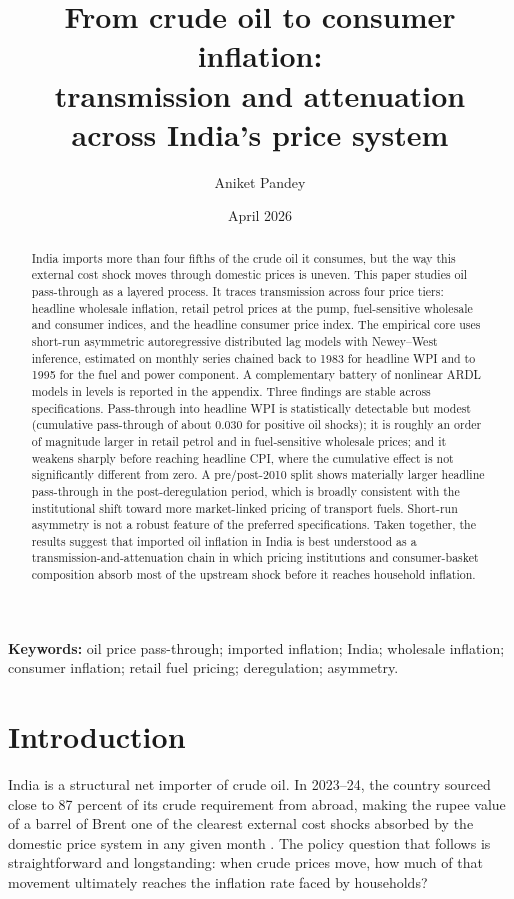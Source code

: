 \documentclass[11pt,a4paper]{article}
\title{\bfseries From crude oil to consumer inflation:\\ transmission and attenuation across India's price system}
\author{Aniket Pandey}
\date{April 2026}
\begin{document}
\maketitle

\begin{abstract}
\noindent India imports more than four fifths of the crude oil it consumes, but the way this external cost shock moves through domestic prices is uneven. This paper studies oil pass-through as a layered process. It traces transmission across four price tiers: headline wholesale inflation, retail petrol prices at the pump, fuel-sensitive wholesale and consumer indices, and the headline consumer price index. The empirical core uses short-run asymmetric autoregressive distributed lag models with Newey--West inference, estimated on monthly series chained back to 1983 for headline WPI and to 1995 for the fuel and power component. A complementary battery of nonlinear ARDL models in levels is reported in the appendix. Three findings are stable across specifications. Pass-through into headline WPI is statistically detectable but modest (cumulative pass-through of about 0.030 for positive oil shocks); it is roughly an order of magnitude larger in retail petrol and in fuel-sensitive wholesale prices; and it weakens sharply before reaching headline CPI, where the cumulative effect is not significantly different from zero. A pre/post-2010 split shows materially larger headline pass-through in the post-deregulation period, which is broadly consistent with the institutional shift toward more market-linked pricing of transport fuels. Short-run asymmetry is not a robust feature of the preferred specifications. Taken together, the results suggest that imported oil inflation in India is best understood as a transmission-and-attenuation chain in which pricing institutions and consumer-basket composition absorb most of the upstream shock before it reaches household inflation.
\end{abstract}

\noindent\textbf{Keywords:} oil price pass-through; imported inflation; India; wholesale inflation; consumer inflation; retail fuel pricing; deregulation; asymmetry.

\bigskip

\section{Introduction}
\label{sec:intro}

India is a structural net importer of crude oil. In 2023--24, the country sourced close to 87 percent of its crude requirement from abroad, making the rupee value of a barrel of Brent one of the clearest external cost shocks absorbed by the domestic price system in any given month \citep{ppac2024}. The policy question that follows is straightforward and longstanding: when crude prices move, how much of that movement ultimately reaches the inflation rate faced by households?
\end{document}
